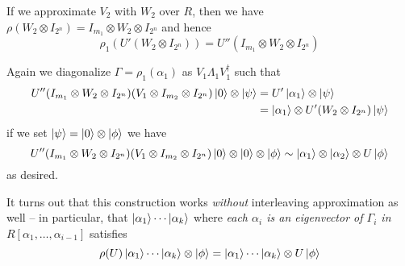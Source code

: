 \documentclass{article}
\theoremstyle{definition}
\theoremstyle{theorem}
\theoremstyle{remark}
\begin{document}
If we approximate $V_2$ with $W_2$ over $R$, then we have $\rho(W_2\otimes I_{2^n}) = I_{m_1}\otimes W_2\otimes I_{2^n}$ and hence
\[
	\rho_1(U'(W_2\otimes I_{2^n})) = U''(I_{m_1}\otimes W_2\otimes I_{2^n})
\]

Again we diagonalize $\Gamma=\rho_1(\alpha_1)$ as $V_1\Lambda_1 V_1^\dagger$ such that
\begin{align*}
	U''(I_{m_1}\otimes W_2\otimes I_{2^n})(V_1\otimes I_{m_2}\otimes I_{2^n})\ket{0}\otimes\ket{\psi} 
		&= U'\ket{\alpha_1}\otimes\ket{\psi}  \\
		&= \ket{\alpha_1}\otimes U'(W_2\otimes I_{2^n})\ket{\psi}
\end{align*}
if we set $\ket{\psi} = \ket{0}\otimes\ket{\phi}$ we have
\[
	U''(I_{m_1}\otimes W_2\otimes I_{2^n})(V_1\otimes I_{m_2}\otimes I_{2^n})\ket{0}\otimes\ket{0}\otimes\ket{\phi} \sim \ket{\alpha_1}\otimes\ket{\alpha_2}\otimes U\ket{\phi}
\]
as desired.

It turns out that this construction works \emph{without} interleaving approximation as well -- in particular, that $\ket{\alpha_1}\cdots\ket{\alpha_k}$ where \emph{each $\alpha_i$ is an eigenvector of $\Gamma_i$ in $R[\alpha_1,\dots,\alpha_{i-1}]$} satisfies
\[
	\rho(U)\ket{\alpha_1}\cdots\ket{\alpha_k}\otimes \ket{\phi} = \ket{\alpha_1}\cdots\ket{\alpha_k}\otimes U\ket{\phi}
\]
\end{document}
